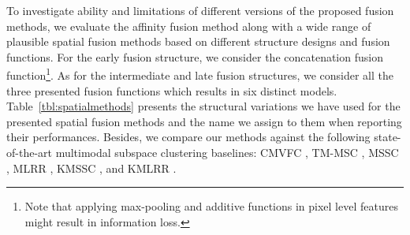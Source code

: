 \documentclass[journal]{IEEEtran}
\begin{document}
\begin{table}[t]
\begin{center}
\caption{Details of the multimodal datasets that are used in the experiments. Note that as opposed to supervised methods, we do not split datasets to training and testing sets in a deep subspace clustering task. } \label{tbl:datasets}
\end{center}
\end{table}		   


To investigate ability and limitations of different versions of the proposed fusion methods,  we evaluate the affinity fusion method along with a wide range of plausible spatial fusion methods based on different structure designs and fusion functions.		    For the early fusion structure, we consider the concatenation fusion function\footnote{Note that applying max-pooling and additive functions in pixel level features might result in information loss.}. 		 As for the intermediate and late fusion structures, we consider all the three presented fusion functions which results in six distinct models. Table~\ref{tbl:spatialmethods} presents the structural variations we have used for the presented spatial fusion methods and the name we assign to them when reporting their performances.	   Besides,  we compare our methods against the following state-of-the-art multimodal subspace clustering baselines: CMVFC \cite{cao2015constrained}, TM-MSC \cite{zhang2015low},  MSSC \cite{abavisani2018multimodal}, MLRR \cite{abavisani2018multimodal}, KMSSC \cite{abavisani2018multimodal}, and KMLRR \cite{abavisani2018multimodal}. 
\end{document}
